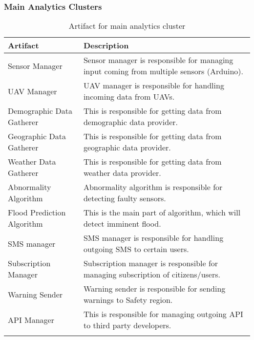 \subsubsection*{Main Analytics Clusters}
\begin{longtable}{L{0.2\textwidth} L{0.6\textwidth}}
	\centering
    \textbf{Artifact} 			& \textbf{Description} \\ \toprule
    Sensor Manager				& Sensor manager is responsible for managing input 									coming from multiple sensors (Arduino).\\ \midrule
    \gls{UAV} Manager 			& \gls{UAV} manager is responsible for handling incoming 							 data from \gls{UAV}s.\\ \midrule
    Demographic Data Gatherer	& This is responsible for getting data from demographic 							data provider.\\ \midrule
    Geographic Data Gatherer	& This is responsible for getting data from geographic 								data provider.\\ \midrule
    Weather Data Gatherer		& This is responsible for getting data from weather data 							 provider.\\ \midrule
    Abnormality Algorithm		& Abnormality algorithm is responsible for detecting 								faulty sensors.\\ \midrule
    Flood Prediction Algorithm  & This is the main part of algorithm, which will detect 							imminent flood. \\ \midrule
    SMS manager 				& SMS manager is responsible for handling outgoing SMS 								to certain users.\\ \midrule
    Subscription Manager 		& Subscription manager is responsible for managing 									subscription of citizens/users.\\ \midrule
    Warning Sender				& Warning sender is responsible for sending warnings to 							Safety region.\\ \midrule
    API Manager 				& This is responsible for managing outgoing API to third 							 party developers.\\ \bottomrule
    \caption{Artifact for main analytics cluster}
	\label{table:main-analytics-artifacts}
\end{longtable}

